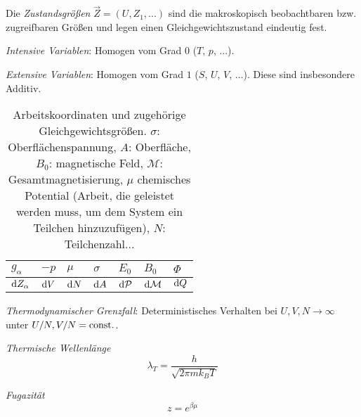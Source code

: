 			Die \emph{Zustandsgrößen} $\vec{Z}=\left(U, Z_1,... \right)$ sind die makroskopisch beobachtbaren bzw. zugreifbaren Größen und legen einen Gleichgewichtszustand eindeutig fest. \vsp

			\emph{Intensive Variablen}: Homogen vom Grad $0$ ($T$, $p$, ...). \vsp

			\emph{Extensive Variablen}: Homogen vom Grad $1$ ($S$, $U$, $V$, ...). Diese sind insbesondere Additiv. \vsp

			\begin{table}[ht]
				\begin{center}
				\begin{tabular}{ l | l l l l l l }
					$g_\alpha$ & $-p$ & $\mu$ & $\sigma$ & $E_0$ & $B_0$ & $\Phi$ \\ \hline
					$\mathrm{d} Z_\alpha$ & $\mathrm{d} V$ & $\mathrm{d} N$ & $\mathrm{d} A$ & $\mathrm{d} \mathcal{P}$ & $\mathrm{d} \mathcal{M}$ & $\mathrm{d} Q$ \\
					\end{tabular}
				\caption{Arbeitskoordinaten und zugehörige Gleichgewichtsgrößen. $\sigma$: Oberflächenspannung, $A$: Oberfläche, $B_0$: magnetische Feld, $\mathcal{M}$: Gesamtmagnetisierung, $\mu$ chemisches Potential (Arbeit, die geleistet werden muss, um dem System ein Teilchen hinzuzufügen), $N$: Teilchenzahl...}
				\label{tab:ArbeitskoordinatenUndGleichgewichtsgroessen}
				\end{center}
			\end{table} \vsp

			\noindent
			\emph{Thermodynamischer Grenzfall}: \newline Deterministisches Verhalten bei $U,V,N\rightarrow\infty$ unter $U/N,V/N=\mathrm{const.}$. \vsp


			\noindent
			\emph{Thermische Wellenlänge}
			\begin{equation}
				\lambda_T = \frac{h}{\sqrt{2\pi m k_B T}}
			\end{equation} \vsp

			\noindent
			\emph{Fugazität}
			\begin{equation}
				z = e^{\beta\mu}
			\end{equation} \vsp


